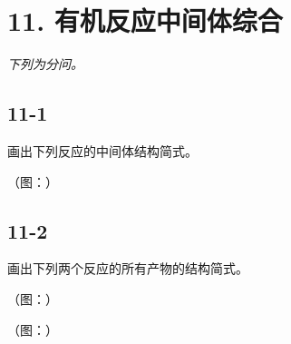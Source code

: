 \section*{11. 有机反应中间体综合}
\textit{下列为分问。}

\subsection*{11-1}
画出下列反应的中间体结构简式。

（图：）

\subsection*{11-2}
画出下列两个反应的所有产物的结构简式。

（图：）

（图：）
